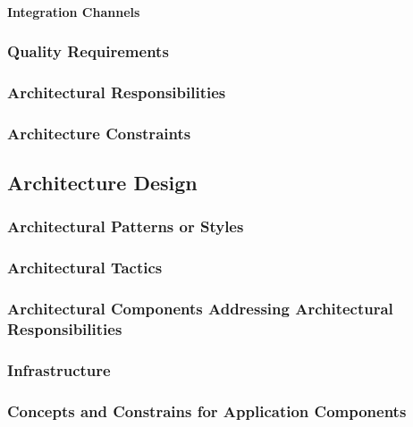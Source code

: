\documentclass[11pt,a4paper]{article}
\begin{document}
\paragraph{Integration Channels}


\subsubsection{Quality Requirements}


\subsubsection{Architectural Responsibilities}


\subsubsection{Architecture Constraints}
\label{sec:systemArchitecturalConstraints}

\subsection{Architecture Design}
\subsubsection{Architectural Patterns or Styles}


\subsubsection{Architectural Tactics}

\subsubsection{Architectural Components Addressing Architectural Responsibilities}


\subsubsection{Infrastructure}

\subsubsection{Concepts and Constrains for Application Components}
\end{document}
